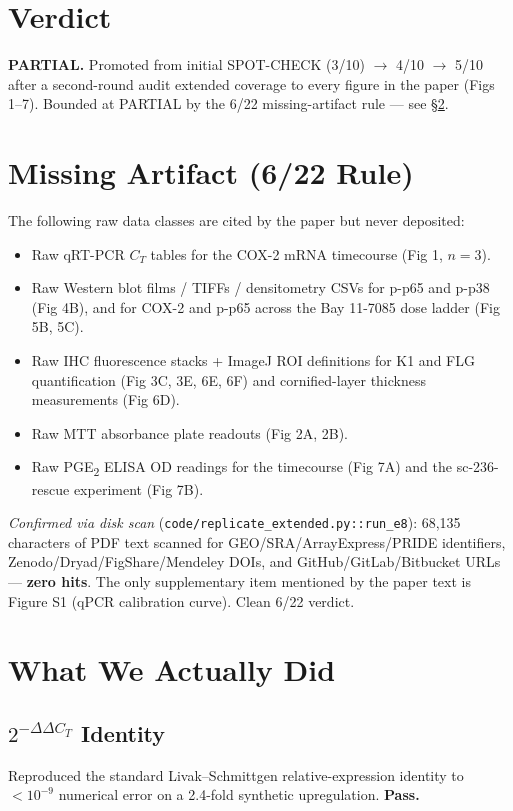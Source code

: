 \documentclass[11pt]{article}
\begin{document}
\section{Verdict}

\textbf{PARTIAL.} Promoted from initial SPOT-CHECK (3/10) $\to$ 4/10 $\to$ 5/10 after a second-round audit extended coverage to every figure in the paper (Figs 1--7). Bounded at PARTIAL by the 6/22 missing-artifact rule --- see \S\ref{sec:missing}.

\section{Missing Artifact (6/22 Rule)}\label{sec:missing}

The following raw data classes are cited by the paper but never deposited:

\begin{itemize}
    \item Raw qRT-PCR $C_T$ tables for the COX-2 mRNA timecourse (Fig 1, $n=3$).
    \item Raw Western blot films / TIFFs / densitometry CSVs for p-p65 and p-p38 (Fig 4B), and for COX-2 and p-p65 across the Bay 11-7085 dose ladder (Fig 5B, 5C).
    \item Raw IHC fluorescence stacks + ImageJ ROI definitions for K1 and FLG quantification (Fig 3C, 3E, 6E, 6F) and cornified-layer thickness measurements (Fig 6D).
    \item Raw MTT absorbance plate readouts (Fig 2A, 2B).
    \item Raw PGE\textsubscript{2} ELISA OD readings for the timecourse (Fig 7A) and the sc-236-rescue experiment (Fig 7B).
\end{itemize}

\emph{Confirmed via disk scan} (\texttt{code/replicate\_extended.py::run\_e8}): 68{,}135 characters of PDF text scanned for GEO/SRA/ArrayExpress/PRIDE identifiers, Zenodo/Dryad/FigShare/Mendeley DOIs, and GitHub/GitLab/Bitbucket URLs --- \textbf{zero hits}. The only supplementary item mentioned by the paper text is Figure S1 (qPCR calibration curve). Clean 6/22 verdict.

\section{What We Actually Did}

\subsection{$2^{-\Delta\Delta C_T}$ Identity}
Reproduced the standard Livak--Schmittgen relative-expression identity to $< 10^{-9}$ numerical error on a 2.4-fold synthetic upregulation. \textbf{Pass.}
\end{document}
